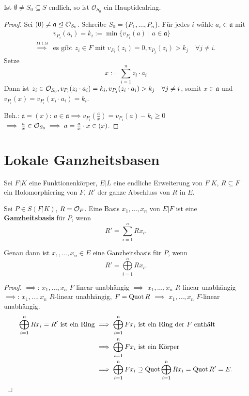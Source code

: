 \begin{satz}
    Ist $\emptyset \ne S_0 \subseteq S$ endlich, so ist $\mathcal{O}_{S_0}$ ein Hauptidealring.
\end{satz}
\begin{proof}
    Sei $(0) \ne \mathfrak{a} \trianglelefteq \mathcal{O}_{S_0}$. Schreibe $S_0 = \{P_1, \ldots, P_n\}$.
    Für jedes $i$ wähle $a_i \in \mathfrak{a}$ mit
    \begin{align*}
        & v_{P_i}(a_i) = k_i := \min \{v_{P_i}(a) \mid a \in \mathfrak{a}\}\\
        \stackrel{II.1.9}{\implies} & \text{es gibt } z_i \in F \text{ mit } v_{P_i}(z_i) = 0, v_{P_j}(z_i) > k_j \quad \forall j\ne i.
    \end{align*} 
    Setze $$x := \sum\limits_{i=1}^n z_i \cdot a_i$$
    Dann ist $z_i \in \mathcal{O}_{S_0}, v_{P_i}(z_i \cdot a_i) = k_i, v_{P_j}(z_i \cdot a_i) > k_j \quad \forall j \ne i$,
    somit $x \in \mathfrak{a}$ und $v_{P_i}(x) = v_{P_i}(x_i\cdot a_i) = k_i$.

    Beh.: $\mathfrak{a} = (x)$: $a \in \mathfrak{a} \implies v_{P_i}(\frac{a}{x}) = v_{P_i}(a) - k_i \geq 0$
    $\implies \frac{a}{x} \in \mathcal{O}_{S_0} \implies a = \frac{a}{x} \cdot x \in (x)$.
\end{proof}

\section{Lokale Ganzheitsbasen}
Sei $F|K$ eine Funktionenkörper, $E|L$ eine endliche Erweiterung von $F|K$, $R \subseteq F$ ein Holomorphiering von $F$,
$R'$ der ganze Abschluss von $R$ in $E$.

\begin{definition}
    Sei $P \in S(F|K)$, $R = \mathcal{O}_P$. Eine Basis $x_1, \ldots, x_n$ von $E|F$ ist eine \textbf{Ganzheitsbasis} für $P$, wenn
    $$ R' = \sum\limits_{i=1}^n R x_i. $$
\end{definition}

\begin{lemma}
    Genau dann ist $x_1,\ldots,x_n\in E$ eine Ganzheitsbasis für $P$, wenn $$R' = \bigoplus\limits_{i=1}^n R x_i.$$
\end{lemma}
\begin{proof}
    $\implies$: $x_1, \ldots, x_n$ $F$-linear unabhängig $\implies$ $x_1, \ldots, x_n$ $R$-linear unabhängig\\
    $\implies$: $x_1,\ldots,x_n$ $R$-linear unabhängig, $F=\operatorname{Quot} R$ $\implies$ $x_1,\ldots,x_n$ $F$-linear unabhängig.
    \begin{align*}
        \bigoplus\limits_{i=1}^n Rx_i = R' \text{ ist ein Ring} & \implies \bigoplus\limits_{i=1}^n Fx_i \text{ ist ein Ring der }F \text{ enthält}\\
        & \implies \bigoplus\limits_{i=1}^n Fx_i \text{ ist ein Körper} \\
        & \implies \bigoplus\limits_{i=1}^n Fx_i \supseteq \operatorname{Quot} \bigoplus\limits_{i=1}^n Rx_i = \operatorname{Quot} R' = E.
    \end{align*}
\end{proof}

